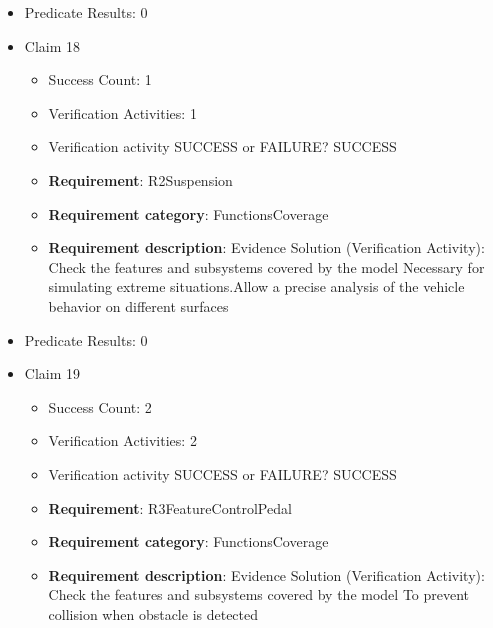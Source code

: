 \documentclass{article}
\begin{document}
\begin{itemize}
\begin{itemize}
						\item \textbf{Requirement}: R1RealisticSimu 
						\item \textbf{Requirement category}: FunctionsCoverage 
						\item \textbf{Requirement description}: Evidence Solution (Verification Activity): Check the features covered by the model, analysis of dynamic response in complex scenarios (e.g., cornering under braking, rapid lane change, uneven road surface)  These phenomena directly influence vehicle stability and braking effectiveness in critical driving scenarios
					
				\end{itemize}
				
									    
				\item Predicate Results: 0

  				  \item Claim 18
				\begin{itemize}
			    	\item Success Count: 1 
			    	\item Verification Activities: 1
					\item Verification activity SUCCESS or FAILURE? SUCCESS
		
						\item \textbf{Requirement}: R2Suspension 
						\item \textbf{Requirement category}: FunctionsCoverage 
						\item \textbf{Requirement description}: Evidence Solution (Verification Activity): Check the features and subsystems covered by the model Necessary for simulating extreme situations.Allow a precise analysis of the vehicle behavior on different surfaces
					
				\end{itemize}
				
									    
				\item Predicate Results: 0

  				  \item Claim 19
				\begin{itemize}
			    	\item Success Count: 2 
			    	\item Verification Activities: 2
					\item Verification activity SUCCESS or FAILURE? SUCCESS
		
						\item \textbf{Requirement}: R3FeatureControlPedal 
						\item \textbf{Requirement category}: FunctionsCoverage 
						\item \textbf{Requirement description}: Evidence Solution (Verification Activity): Check the features and subsystems covered by the model  To prevent collision when obstacle is detected
					

\end{itemize}
\end{itemize}
\end{document}
